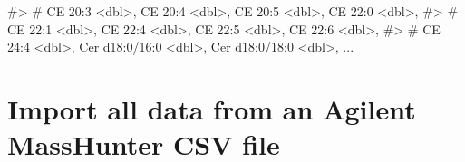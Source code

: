 \documentclass[
  letterpaper,
  DIV=11,
  numbers=noendperiod]{scrreprt}
\newenvironment{Shaded}{\begin{snugshade}}{\end{snugshade}}
\newcommand{\CommentTok}[1]{\textcolor[rgb]{0.37,0.37,0.37}{#1}}
\begin{document}
\begin{Shaded}
\begin{Highlighting}[]
\CommentTok{\#\textgreater{} \#   \textasciigrave{}CE 20:3\textasciigrave{} \textless{}dbl\textgreater{}, \textasciigrave{}CE 20:4\textasciigrave{} \textless{}dbl\textgreater{}, \textasciigrave{}CE 20:5\textasciigrave{} \textless{}dbl\textgreater{}, \textasciigrave{}CE 22:0\textasciigrave{} \textless{}dbl\textgreater{},}
\CommentTok{\#\textgreater{} \#   \textasciigrave{}CE 22:1\textasciigrave{} \textless{}dbl\textgreater{}, \textasciigrave{}CE 22:4\textasciigrave{} \textless{}dbl\textgreater{}, \textasciigrave{}CE 22:5\textasciigrave{} \textless{}dbl\textgreater{}, \textasciigrave{}CE 22:6\textasciigrave{} \textless{}dbl\textgreater{},}
\CommentTok{\#\textgreater{} \#   \textasciigrave{}CE 24:4\textasciigrave{} \textless{}dbl\textgreater{}, \textasciigrave{}Cer d18:0/16:0\textasciigrave{} \textless{}dbl\textgreater{}, \textasciigrave{}Cer d18:0/18:0\textasciigrave{} \textless{}dbl\textgreater{}, ...}
\end{Highlighting}
\end{Shaded}

\hypertarget{import-all-data-from-an-agilent-masshunter-csv-file}{%
\section{Import all data from an Agilent MassHunter CSV
file}\label{import-all-data-from-an-agilent-masshunter-csv-file}}
\end{document}
